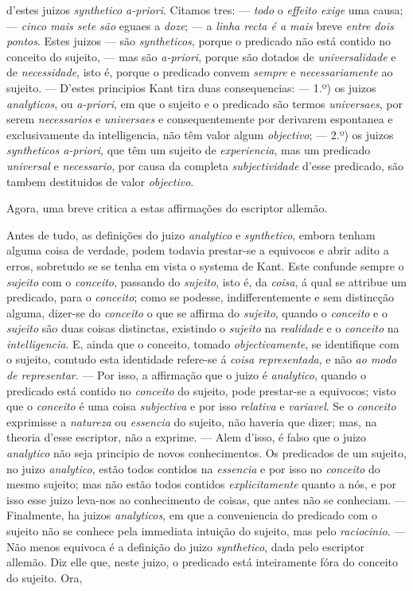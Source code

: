 d'estes juizos \emph{synthetico a-priori}. Citamos tres: --- \emph{todo} o \emph{effeito exige} uma causa; --- \emph{cinco mais sete são} eguaes a \emph{doze}; --- a \emph{linha recta é a mais} breve \emph{entre dois pontos}. Estes juizos --- são \emph{syntheticos}, porque o predicado não está contido no conceito do sujeito, --- mas são \emph{a-priori}, porque são dotados de \emph{universalidade} e de \emph{necessidade}, isto é, porque o predicado convem \emph{sempre} e \emph{necessariamente} ao sujeito. --- D'estes principios Kant tira duas consequencias: --- 1.º) os juizos \emph{analyticos}, ou \emph{a-priori}, em que o sujeito e o predicado são termos \emph{universaes}, por serem \emph{necessarios} e \emph{universaes} e consequentemente por derivarem espontanea e exclusivamente da intelligencia, não têm valor algum \emph{objectivo}; --- 2.º) os juizos \emph{syntheticos a-priori}, que têm um sujeito de \emph{experiencia}, mas um predicado \emph{universal} e \emph{necessario}, por causa da completa \emph{subjectividade} d'esse predicado, são tambem destituidos de valor \emph{objectivo}.\par Agora, uma breve critica a estas affirmações do escriptor allemão.\par Antes de tudo, as definições do juizo \emph{analytico} e \emph{synthetico}, embora tenham alguma coisa de verdade, podem todavia prestar-se a equivocos e abrir adito a erros, sobretudo se se tenha em vista o systema de Kant. Este confunde sempre o \emph{sujeito} com o \emph{conceito}, passando do \emph{sujeito}, isto é, da \emph{coisa}, á qual se attribue um predicado, para o \emph{conceito}; como se podesse, indifferentemente e sem distincção alguma, dizer-se do \emph{conceito} o que se affirma do \emph{sujeito}, quando o \emph{conceito} e o \emph{sujeito} são duas coisas distinctas, existindo o \emph{sujeito} na \emph{realidade} e o \emph{conceito} na \emph{intelligencia}. E, ainda que o conceito, tomado \emph{objectivamente}, se identifique com o sujeito, comtudo esta identidade refere-se á \emph{coisa representada}, e não \emph{ao modo de representar}. --- Por isso, a affirmação que o juizo é \emph{analytico}, quando o predicado está contido no \emph{conceito} do sujeito, pode prestar-se a equivocos; visto que o \emph{conceito} é uma coisa \emph{subjectiva} e por isso \emph{relativa} e \emph{variavel}. Se o \emph{conceito} exprimisse a \emph{natureza} ou \emph{essencia} do sujeito, não haveria que dizer; mas, na theoria d'esse escriptor, não a exprime. --- Alem d'isso, é falso que o juizo \emph{analytico} não seja principio de novos conhecimentos. Os predicados de um sujeito, no juizo \emph{analytico}, estão todos contidos na \emph{essencia} e por isso no \emph{conceito} do mesmo sujeito; mas não estão todos contidos \emph{explicitamente} quanto a nós, e por isso esse juizo leva-nos ao conhecimento de coisas, que antes não se conheciam. --- Finalmente, ha juizos \emph{analyticos}, em que a conveniencia do predicado com o sujeito não se conhece pela immediata intuição do sujeito, mas pelo \emph{raciocinio}. --- Não menos equivoca é a definição do juizo \emph{synthetico}, dada pelo escriptor allemão. Diz elle que, neste juizo, o predicado está inteiramente fóra do conceito do sujeito. Ora, 
